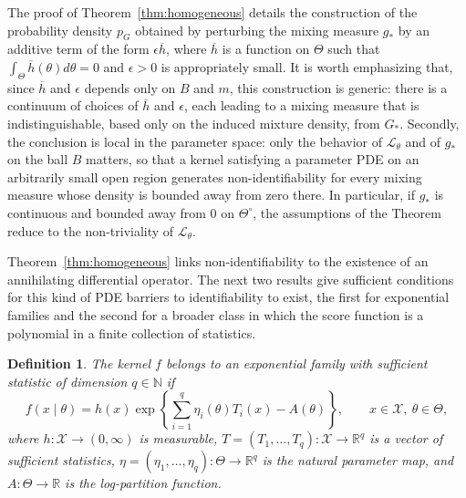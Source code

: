 \documentclass[11pt,twoside]{article} %
\newtheorem{definition}{Definition}
\begin{document}
The proof of Theorem~\ref{thm:homogeneous} details the construction of the probability density $p_G$ obtained by perturbing the mixing measure $g_*$ by an additive term of the form $\epsilon \overline{h}$, where $\overline{h}$ is a function on $\Theta$ such that $\int_\Theta \overline{h}(\theta) d \theta = 0$ and $\epsilon > 0$ is appropriately small. It is worth emphasizing that, since $\overline{h}$ and $\epsilon$ depends only on $B$ and $m$, this construction is generic: there is a continuum of choices of $\overline{h}$ and $\epsilon$, each leading to a mixing measure that is indistinguishable,  based only on the induced mixture density, from $G_*$. Secondly, the conclusion is local in the parameter space: only the behavior of $\mathcal L_\theta$ and of $g_*$ on the ball $B$ matters, so that a kernel satisfying a parameter PDE on an arbitrarily small open region generates non-identifiability for every mixing measure whose density is bounded away from zero there. In particular, if $g_*$ is continuous and bounded away from $0$ on $\Theta^\circ$, the assumptions of the Theorem reduce to the non-triviality of $\mathcal L_\theta$.



Theorem~\ref{thm:homogeneous} links non-identifiability to the existence of an annihilating differential operator. The next two results give sufficient conditions for this kind of PDE barriers to identifiability to exist, the first for exponential families and the second for a broader class in which the score function is a polynomial in a finite collection of statistics.

\begin{definition}\label{def:exp_family}
The kernel $f$ belongs to an \emph{exponential family} with sufficient statistic of dimension $q\in\mathbb N$ if
%
\begin{equation}\label{eq:exp_family}
    f(x\mid\theta)=h(x)\exp\left\{\sum_{i=1}^q\eta_i(\theta)T_i(x)-A(\theta)\right\},\qquad x\in\mathcal X,\ \theta\in\Theta,
\end{equation}
%
where $h:\mathcal X\to(0,\infty)$ is measurable, $T=(T_1,\ldots,T_q):\mathcal X\to\mathbb R^q$ is a vector of sufficient statistics, $\eta=(\eta_1,\ldots,\eta_q):\Theta\to\mathbb R^q$ is the natural parameter map, and $A:\Theta\to\mathbb R$ is the log-partition function.
\end{definition}
\end{document}
